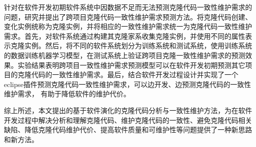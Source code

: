 {针对在软件开发初期软件系统中因数据不足而无法预测克隆代码一致性维护需求的问题，研究并提出了跨项目克隆代码一致性维护需求预测方法。将克隆代码创建、变化实例统称为克隆实例，并将相应的一致性维护需求统一为克隆代码一致性维护需求。首先，对软件系统通过构建其克隆家系收集克隆实例，并使用不同的属性表示克隆实例。然后，将不同的软件系统划分为训练系统和测试系统，使用训练系统的数据训练机器学习模型，在测试系统上验证跨项目克隆一致性维护需求的预测效果。实验结果表明跨项目一致性维护需求预测模型可以在软件开发初期预测其它项目的克隆代码的一致性维护需求。最后，结合软件开发过程设计并实现了一个eclipse插件预测克隆代码一致性维护需求，可以边开发、边预测克隆代码的一致性维护需求， 有助于降低软件的维护代价。

综上所述，本文提出的基于软件演化的克隆代码分析与一致性维护方法，为在软件开发过程中解决分析和理解克隆代码、维护克隆代码的一致性、避免克隆代码相关缺陷、降低克隆代码维护代价、提高软件质量和可维护性等问题提供了一种新思路和新方法。
}


